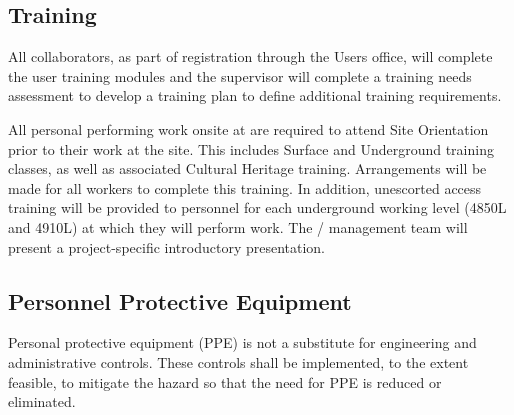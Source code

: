 \subsection{ Training}

All  collaborators, as part of registration through the \fnal Users office,
will complete the user  training modules and the supervisor
will complete a training needs assessment to develop a training plan
to define additional   training requirements.

All personal performing work onsite at  are required to
attend   Site Orientation prior to their work
at the site.  This includes  Surface and Underground
training classes, as well as associated Cultural Heritage
training. Arrangements will be made for all workers to complete this
training. In addition, unescorted access training will be provided to
personnel for each underground working level (4850L and 4910L) at
which they will perform work.  The /
 management team will present a project-specific
introductory  presentation.

\subsection{Personnel Protective Equipment}

Personal protective equipment (PPE) is not a substitute for
engineering and administrative controls. These controls shall be
implemented, to the extent feasible, to mitigate the hazard so that
the need for PPE is reduced or eliminated.

